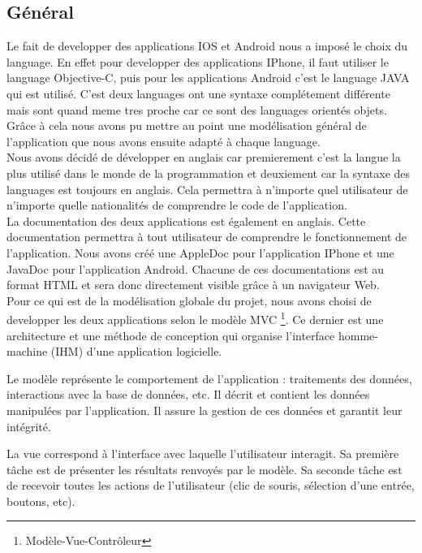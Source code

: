 \subsection{Général}
	Le fait de developper des applications IOS et Android nous a imposé le choix du language. En effet pour developper des applications IPhone, il faut utiliser le language Objective-C, puis  pour les applications Android c'est le language JAVA qui est utilisé. C'est deux languages ont une syntaxe complétement différente mais sont quand meme tres proche car ce sont des languages orientés objets. Grâce à cela nous avons pu mettre au point une modélisation général de l'application que nous avons ensuite adapté à chaque language.\\
			
	Nous avons décidé de développer en anglais car premierement c'est la langue la plus utilisé dans le monde de la programmation et deuxiement car la syntaxe des languages est toujours en anglais. Cela permettra à n'importe quel utilisateur de n'importe quelle nationalités de comprendre le code de l'application.\\
			
	La documentation des deux applications est également en anglais. Cette documentation permettra à tout utilisateur de comprendre le fonctionnement de l'application.
	Nous avons créé une AppleDoc pour l'application IPhone et une JavaDoc pour l'application Android. Chacune de ces documentations est au format HTML et sera donc directement visible grâce à un navigateur Web.\\
			
	Pour ce qui est de la modélisation globale du projet, nous avons choisi de developper les deux applications selon le modèle MVC \footnote{Modèle-Vue-Contrôleur}. Ce dernier est une architecture et une méthode de conception qui organise l'interface homme-machine (IHM) d'une application logicielle. 
			
	Le modèle représente le comportement de l'application : traitements des données, interactions avec la base de données, etc. Il décrit et contient les données manipulées par l'application. Il assure la gestion de ces données et garantit leur intégrité.
			
	La vue correspond à l'interface avec laquelle l'utilisateur interagit. Sa première tâche est de présenter les résultats renvoyés par le modèle. Sa seconde tâche est de recevoir toutes les actions de l'utilisateur (clic de souris, sélection d'une entrée, boutons, etc).
			
